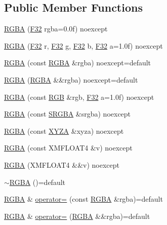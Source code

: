 \subsection*{Public Member Functions}
\begin{DoxyCompactItemize}
\item 
\hyperlink{structmage_1_1_r_g_b_a_a964d2235221668b6284b07dcc296c9f9}{R\+G\+BA} (\hyperlink{namespacemage_aa97e833b45f06d60a0a9c4fc22ae02c0}{F32} rgba=0.\+0f) noexcept
\item 
\hyperlink{structmage_1_1_r_g_b_a_a9665c78c3ba560a9fd40e82ce0fe1fdb}{R\+G\+BA} (\hyperlink{namespacemage_aa97e833b45f06d60a0a9c4fc22ae02c0}{F32} r, \hyperlink{namespacemage_aa97e833b45f06d60a0a9c4fc22ae02c0}{F32} g, \hyperlink{namespacemage_aa97e833b45f06d60a0a9c4fc22ae02c0}{F32} b, \hyperlink{namespacemage_aa97e833b45f06d60a0a9c4fc22ae02c0}{F32} a=1.\+0f) noexcept
\item 
\hyperlink{structmage_1_1_r_g_b_a_af933ec985b66a41dd84d688d7e3b5435}{R\+G\+BA} (const \hyperlink{structmage_1_1_r_g_b_a}{R\+G\+BA} \&rgba) noexcept=default
\item 
\hyperlink{structmage_1_1_r_g_b_a_a365e889de124c38e8028778b015fa866}{R\+G\+BA} (\hyperlink{structmage_1_1_r_g_b_a}{R\+G\+BA} \&\&rgba) noexcept=default
\item 
\hyperlink{structmage_1_1_r_g_b_a_a3ad16fa7061df686a1adca3476a401eb}{R\+G\+BA} (const \hyperlink{structmage_1_1_r_g_b}{R\+GB} \&rgb, \hyperlink{namespacemage_aa97e833b45f06d60a0a9c4fc22ae02c0}{F32} a=1.\+0f) noexcept
\item 
\hyperlink{structmage_1_1_r_g_b_a_a82b256781126a25fd7a9a84a75fffb90}{R\+G\+BA} (const \hyperlink{structmage_1_1_s_r_g_b_a}{S\+R\+G\+BA} \&srgba) noexcept
\item 
\hyperlink{structmage_1_1_r_g_b_a_a008be57a6540fee8ed02d285681e3ed4}{R\+G\+BA} (const \hyperlink{structmage_1_1_x_y_z_a}{X\+Y\+ZA} \&xyza) noexcept
\item 
\hyperlink{structmage_1_1_r_g_b_a_a0c3fee949a99b062b6d2b22d9dff6fcb}{R\+G\+BA} (const X\+M\+F\+L\+O\+A\+T4 \&v) noexcept
\item 
\hyperlink{structmage_1_1_r_g_b_a_ac34e3eaf2168f5832d4e02ba4e446440}{R\+G\+BA} (X\+M\+F\+L\+O\+A\+T4 \&\&v) noexcept
\item 
\hyperlink{structmage_1_1_r_g_b_a_a139a22381a3fb02d1f28be505b41c9df}{$\sim$\+R\+G\+BA} ()=default
\item 
\hyperlink{structmage_1_1_r_g_b_a}{R\+G\+BA} \& \hyperlink{structmage_1_1_r_g_b_a_ad98ba07626877d31e2947532eed217c4}{operator=} (const \hyperlink{structmage_1_1_r_g_b_a}{R\+G\+BA} \&rgba)=default
\item 
\hyperlink{structmage_1_1_r_g_b_a}{R\+G\+BA} \& \hyperlink{structmage_1_1_r_g_b_a_ae3a37c24a96e02078fc804ea2fb5be63}{operator=} (\hyperlink{structmage_1_1_r_g_b_a}{R\+G\+BA} \&\&rgba)=default
\end{DoxyCompactItemize}


